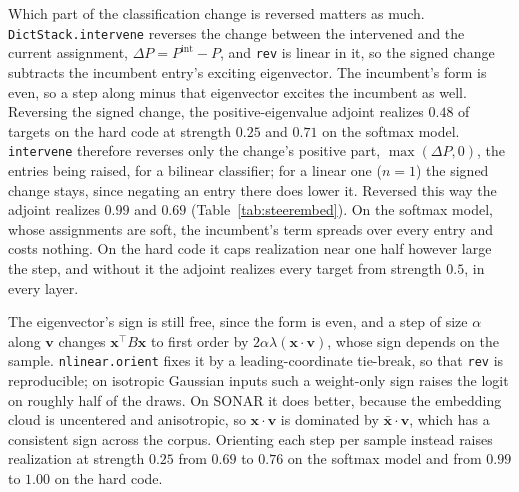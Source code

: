 Which part of the classification change is reversed matters as much.
\texttt{DictStack.intervene} reverses the change between the intervened
and the current assignment, $\Delta P = P^{\mathrm{int}} - P$, and
\texttt{rev} is linear in it, so the signed change subtracts the
incumbent entry's exciting eigenvector. The incumbent's form is even, so a
step along minus that eigenvector excites the incumbent as well. Reversing
the signed change, the positive-eigenvalue adjoint realizes $0.48$ of
targets on the hard code at strength $0.25$ and $0.71$ on the softmax
model. \texttt{intervene} therefore reverses only the change's positive part,
$\max(\Delta P, 0)$, the entries being raised, for a bilinear classifier;
for a linear one ($n{=}1$) the signed change stays, since negating an entry
there does lower it. Reversed this way the adjoint realizes $0.99$ and $0.69$
(Table~\ref{tab:steerembed}). On the softmax model, whose assignments are
soft, the incumbent's term spreads over every entry and costs nothing. On the
hard code it caps realization near one half however large the step, and
without it the adjoint realizes every target from strength $0.5$, in every
layer.

The eigenvector's sign is still free, since the form is even, and a step of
size $\alpha$ along $\mathbf{v}$ changes $\mathbf{x}^\top B\mathbf{x}$ to
first order by $2\alpha\lambda(\mathbf{x}\cdot\mathbf{v})$, whose sign
depends on the sample. \texttt{nlinear.orient} fixes it by a
leading-coordinate tie-break, so that \texttt{rev} is reproducible; on
isotropic Gaussian inputs such a weight-only sign raises the logit on
roughly half of the draws. On SONAR it does better, because the embedding
cloud is uncentered and anisotropic, so $\mathbf{x}\cdot\mathbf{v}$ is
dominated by $\bar{\mathbf{x}}\cdot\mathbf{v}$, which has a consistent sign
across the corpus. Orienting each step per sample instead raises
realization at strength $0.25$ from $0.69$ to $0.76$ on the softmax model
and from $0.99$ to $1.00$ on the hard code.

